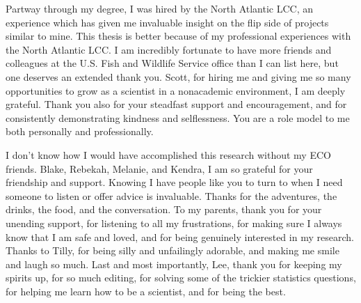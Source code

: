 Partway through my degree, I was hired by the North Atlantic LCC, an experience which has given me invaluable insight on the flip side of projects similar to mine. This thesis is better because of my professional experiences with the North Atlantic LCC. I am incredibly fortunate to have more friends and colleagues at the U.S. Fish and Wildlife Service office than I can list here, but one deserves an extended thank you. Scott, for hiring me and giving me so many opportunities to grow as a scientist in a nonacademic environment, I am deeply grateful. Thank you also for your steadfast support and encouragement, and for consistently demonstrating kindness and selflessness. You are a role model to me both personally and professionally.

I don't know how I would have accomplished this research without my ECO friends. Blake, Rebekah, Melanie, and Kendra, I am so grateful for your friendship and support. Knowing I have people like you to turn to when I need someone to listen or offer advice is invaluable. Thanks for the adventures, the drinks, the food, and the conversation. To my parents, thank you for your unending support, for listening to all my frustrations, for making sure I always know that I am safe and loved, and for being genuinely interested in my research. Thanks to Tilly, for being silly and unfailingly adorable, and making me smile and laugh so much. Last and most importantly, Lee, thank you for keeping my spirits up, for so much editing, for solving some of the trickier statistics questions, for helping me learn how to be a scientist, and for being the best. 

